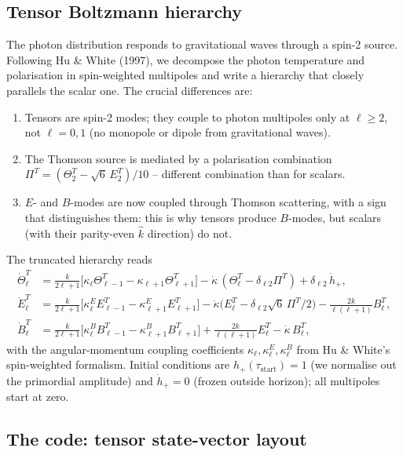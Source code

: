 \subsection{Tensor Boltzmann hierarchy}

The photon distribution responds to gravitational waves through a spin-2 source. Following Hu \& White (1997), we decompose the photon temperature and polarisation in spin-weighted multipoles and write a hierarchy that closely parallels the scalar one. The crucial differences are:
\begin{enumerate}
  \item Tensors are spin-2 modes; they couple to photon multipoles only at $\ell \geq 2$, not $\ell = 0, 1$ (no monopole or dipole from gravitational waves).
  \item The Thomson source is mediated by a polarisation combination $\Pi^T = (\Theta^T_2 - \sqrt{6}\, E^T_2)/10$ -- different combination than for scalars.
  \item $E$- and $B$-modes are now coupled through Thomson scattering, with a sign that distinguishes them: this is why tensors produce $B$-modes, but scalars (with their parity-even $\hat k$ direction) do not.
\end{enumerate}

The truncated hierarchy reads
\begin{align}
  \dot \Theta^T_\ell &= \frac{k}{2\ell + 1}\bigl[\kappa_\ell \Theta^T_{\ell - 1} - \kappa_{\ell + 1}\Theta^T_{\ell + 1}\bigr] - \dot\kappa\,(\Theta^T_\ell - \delta_{\ell 2}\Pi^T) + \delta_{\ell 2}\,\dot h_+, \\
  \dot E^T_\ell &= \frac{k}{2\ell + 1}\bigl[\kappa^E_\ell E^T_{\ell - 1} - \kappa^E_{\ell + 1} E^T_{\ell + 1}\bigr] - \dot\kappa\bigl(E^T_\ell - \delta_{\ell 2}\sqrt{6}\,\Pi^T/2\bigr) - \frac{2k}{\ell(\ell+1)}B^T_\ell, \\
  \dot B^T_\ell &= \frac{k}{2\ell + 1}\bigl[\kappa^B_\ell B^T_{\ell - 1} - \kappa^B_{\ell + 1} B^T_{\ell + 1}\bigr] + \frac{2k}{\ell(\ell + 1)}E^T_\ell - \dot\kappa\, B^T_\ell,
\end{align}
with the angular-momentum coupling coefficients $\kappa_\ell, \kappa^E_\ell, \kappa^B_\ell$ from Hu \& White's spin-weighted formalism. Initial conditions are $h_+(\tau_\mathrm{start}) = 1$ (we normalise out the primordial amplitude) and $\dot h_+ = 0$ (frozen outside horizon); all multipoles start at zero.

\subsection{The code: tensor state-vector layout}

